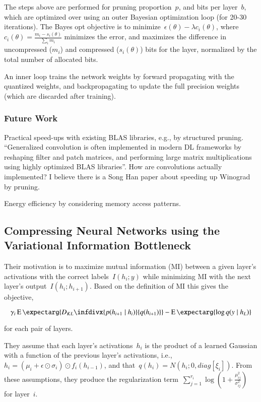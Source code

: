 \documentclass[a4paper, 12pt]{article}
\newcommand{\expect}{\operatorname{E}\expectarg}
\newcommand{\infdiv}{D_{KL}\infdivx}
\begin{document}
The steps above are performed for pruning proportion~$p$, and bits per
layer~$b$, which are optimized over using an outer Bayesian optimization loop
(for 20-30 iterations). The Bayes opt objective is to
minimize~$\epsilon(\theta) - \lambda c_i(\theta)$,
where~$c_i(\theta) = \frac{m_i - s_i(\theta)}{\sum_i m_i}$ minimizes the error,
and maximizes the difference in uncompressed ($m_i$) and compressed
($s_i(\theta)$) bits for the layer, normalized by the total number of allocated
bits.

An inner loop trains the network weights by forward propagating with the
quantized weights, and backpropagating to update the full precision weights
(which are discarded after training).


\subsubsection{Future Work}

Practical speed-ups with existing BLAS libraries, e.g., by structured pruning.
``Generalized convolution is often implemented in modern DL frameworks by
reshaping filter and patch matrices, and performing large matrix
multiplications using highly optimized BLAS libraries''. How are convolutions
actually implemented? I believe there is a Song Han paper about speeding up
Winograd by pruning.

Energy efficiency by considering memory access patterns.


\subsection{Compressing Neural Networks using the Variational Information
            Bottleneck~\cite{dai2018vib}}

Their motivation is to maximize mutual information (MI) between a given layer's
activations with the correct labels~$I(h_i ; y)$ while minimizing MI with the
next layer's output~$I(h_i ; h_{i + 1})$. Based on the definition of MI this
gives the objective,

\begin{equation}
        \gamma_i \expect{\infdiv{p(h_{i + 1} \mid h_i)}{q(h_{i + 1})}} - \expect{\log q(y \mid h_L)}
\end{equation}

for each pair of layers.

They assume that each layer's activations~$h_i$ is the product of a learned
Gaussian with a function of the previous layer's activations,
i.e.,~$h_i = (\mu_i + \epsilon \odot \sigma_i) \odot f_i(h_{i - 1})$, and
that~$q(h_i) = N(h_i ; 0, diag[\xi_i])$. From these assumptions, they produce
the regularization
term~$\sum_{j = 1}^{r_i} \log\left(1 + \frac{\mu_{ij}^2}{\sigma_{ij}^2}\right)$
for layer~$i$.
\end{document}

